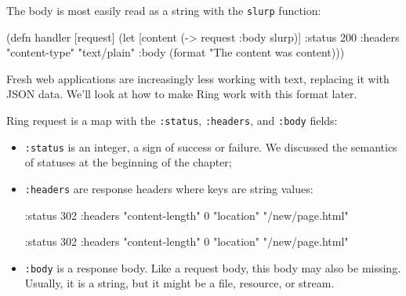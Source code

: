 The body is most easily read as a string with the \verb|slurp| function:

\ifx\DEVICETYPE\MOBILE

\begin{clojure}
(defn handler [request]
 (let [content (-> request :body slurp)]
  {:status 200
   :headers {"content-type" "text/plain"}
   :body (format "The content was %
                 content)}))
\end{clojure}

\else


\fi

Fresh web applications are increasingly less working with text, replacing it with JSON data. We'll look at how to make Ring work with this format later.


Ring request is a map with the \verb|:status|, \verb|:headers|, and \verb|:body| fields:

\begin{itemize}

\item
\verb|:status| is an integer, a sign of success or failure. We discussed the semantics of statuses at the beginning of the chapter;

\item
\verb|:headers| are response headers where keys are string values:


\ifx\DEVICETYPE\MOBILE

\begin{clojure}
{:status 302
 :headers
   {"content-length" 0
    "location" "/new/page.html"}}
\end{clojure}

\else

\begin{clojure}
{:status 302
 :headers {"content-length" 0
           "location" "/new/page.html"}}
\end{clojure}

\fi

\item
\verb|:body| is a response body. Like a request body, this body may also be missing. Usually, it is a string, but it might be a file, resource, or stream.

\end{itemize}

